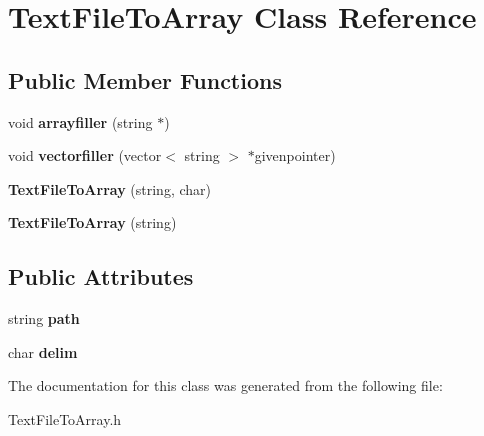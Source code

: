 \hypertarget{class_text_file_to_array}{\section{Text\-File\-To\-Array Class Reference}
\label{class_text_file_to_array}
}
\subsection*{Public Member Functions}
\begin{DoxyCompactItemize}
\item 
\hypertarget{class_text_file_to_array_a167cd452c06cc15be508f39cb3bbe723}{void {\bfseries arrayfiller} (string $\ast$)}\label{class_text_file_to_array_a167cd452c06cc15be508f39cb3bbe723}

\item 
\hypertarget{class_text_file_to_array_a47750fb3dbdc2f1d253b288ff446ce66}{void {\bfseries vectorfiller} (vector$<$ string $>$ $\ast$givenpointer)}\label{class_text_file_to_array_a47750fb3dbdc2f1d253b288ff446ce66}

\item 
\hypertarget{class_text_file_to_array_a8f954e263c5c5fed77dd40c7f2dff17b}{{\bfseries Text\-File\-To\-Array} (string, char)}\label{class_text_file_to_array_a8f954e263c5c5fed77dd40c7f2dff17b}

\item 
\hypertarget{class_text_file_to_array_a798bc49f0d971c29e70ee279cdad29f9}{{\bfseries Text\-File\-To\-Array} (string)}\label{class_text_file_to_array_a798bc49f0d971c29e70ee279cdad29f9}

\end{DoxyCompactItemize}
\subsection*{Public Attributes}
\begin{DoxyCompactItemize}
\item 
\hypertarget{class_text_file_to_array_a68373950023170cdd9d81b86c3a20a9b}{string {\bfseries path}}\label{class_text_file_to_array_a68373950023170cdd9d81b86c3a20a9b}

\item 
\hypertarget{class_text_file_to_array_a425dd326dee89276ab6ead69053cee95}{char {\bfseries delim}}\label{class_text_file_to_array_a425dd326dee89276ab6ead69053cee95}

\end{DoxyCompactItemize}


The documentation for this class was generated from the following file\-:\begin{DoxyCompactItemize}
\item 
Text\-File\-To\-Array.\-h\end{DoxyCompactItemize}
